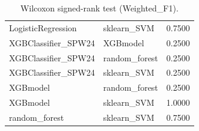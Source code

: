 \begin{table}[t]
\begin{tabular}{llr}
LogisticRegression & sklearn_SVM & 0.7500 \\
XGBClassifier_SPW24 & XGBmodel & 0.2500 \\
XGBClassifier_SPW24 & random_forest & 0.2500 \\
XGBClassifier_SPW24 & sklearn_SVM & 0.2500 \\
XGBmodel & random_forest & 0.2500 \\
XGBmodel & sklearn_SVM & 1.0000 \\
random_forest & sklearn_SVM & 0.7500 \\
\bottomrule
\end{tabular}
\caption{Wilcoxon signed-rank test (Weighted_F1).}
\label{tab:wilcoxon_Weighted_F1}
\end{table}